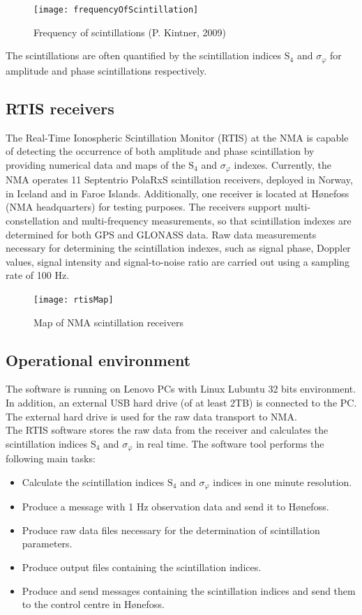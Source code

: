 \documentclass{themeensg}
\begin{document}
\begin{figure}[ht]
	\centering
	\texttt{[image: frequencyOfScintillation]}
	\caption{Frequency of scintillations (P. Kintner, 2009)}
	\label{map}
\end{figure}

The scintillations are often quantified by the scintillation indices $\text{S}_{\text{4}}$ and $\sigma_\varphi$ for amplitude and phase scintillations respectively.

\subsection{RTIS receivers} 
The Real-Time Ionospheric Scintillation Monitor (RTIS) at the NMA is capable of detecting the occurrence of both amplitude and phase scintillation by providing numerical data and maps of the $\text{S}_{\text{4}}$ and $\sigma_\varphi$ indexes. Currently, the NMA operates 11 Septentrio PolaRxS scintillation receivers, deployed in Norway, in Iceland and in Faroe Islands. Additionally, one receiver is located at Hønefoss (NMA headquarters) for testing purposes. The receivers support multi-constellation and multi-frequency measurements, so that scintillation indexes are determined for both GPS and GLONASS data. Raw data measurements necessary for determining the scintillation indexes, such as signal phase, Doppler values, signal intensity and signal-to-noise ratio are carried out using a sampling rate of 100 Hz. \\
 
\begin{figure}[!hb]
	\centering
	\texttt{[image: rtisMap]}
	\caption{Map of NMA scintillation receivers}
\end{figure}

\subsection{Operational environment}
The software is running on Lenovo PCs with Linux Lubuntu 32 bits environment. In addition, an external USB hard drive (of at least 2TB) is connected to the PC. The external hard drive is used for the raw data transport to NMA.\\

The RTIS software stores the raw data from the receiver and calculates the scintillation indices $\text{S}_{\text{4}}$ and $\sigma_\varphi$ in real time. 
The software tool performs the following main tasks:
\begin{itemize}
\item Calculate the scintillation indices $\text{S}_{\text{4}}$ and $\sigma_\varphi$ indices in one minute resolution.
\item Produce a message with 1 Hz observation data and send it to Hønefoss.
\item Produce raw data files necessary for the determination of scintillation parameters.
\item Produce output files containing the scintillation indices. 
\item Produce and send messages containing the scintillation indices and send them to the control centre in Hønefoss.
\end{itemize}
\end{document}
